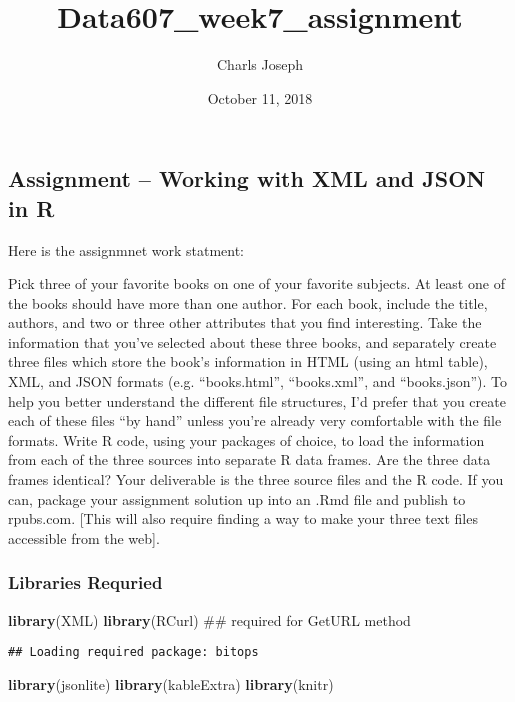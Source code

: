 \documentclass[]{article}
\title{Data607\_week7\_assignment}
\author{Charls Joseph}
\date{October 11, 2018}
\newenvironment{Shaded}{\begin{snugshade}}{\end{snugshade}}
\newcommand{\KeywordTok}[1]{\textcolor[rgb]{0.13,0.29,0.53}{\textbf{#1}}}
\newcommand{\NormalTok}[1]{#1}
\begin{document}
\maketitle

\subsection{Assignment -- Working with XML and JSON in
R}\label{assignment-working-with-xml-and-json-in-r}

Here is the assignmnet work statment:

Pick three of your favorite books on one of your favorite subjects. At
least one of the books should have more than one author. For each book,
include the title, authors, and two or three other attributes that you
find interesting. Take the information that you've selected about these
three books, and separately create three files which store the book's
information in HTML (using an html table), XML, and JSON formats (e.g.
``books.html'', ``books.xml'', and ``books.json''). To help you better
understand the different file structures, I'd prefer that you create
each of these files ``by hand'' unless you're already very comfortable
with the file formats. Write R code, using your packages of choice, to
load the information from each of the three sources into separate R data
frames. Are the three data frames identical? Your deliverable is the
three source files and the R code. If you can, package your assignment
solution up into an .Rmd file and publish to rpubs.com. {[}This will
also require finding a way to make your three text files accessible from
the web{]}.

\subsubsection{Libraries Requried}\label{libraries-requried}

\begin{Shaded}
\begin{Highlighting}[]
\KeywordTok{library}\NormalTok{(XML)    }
\KeywordTok{library}\NormalTok{(RCurl)  ## required for GetURL method }
\end{Highlighting}
\end{Shaded}

\begin{verbatim}
## Loading required package: bitops
\end{verbatim}

\begin{Shaded}
\begin{Highlighting}[]
\KeywordTok{library}\NormalTok{(jsonlite)}
\KeywordTok{library}\NormalTok{(kableExtra)}
\KeywordTok{library}\NormalTok{(knitr)}
\end{Highlighting}
\end{Shaded}
\end{document}
